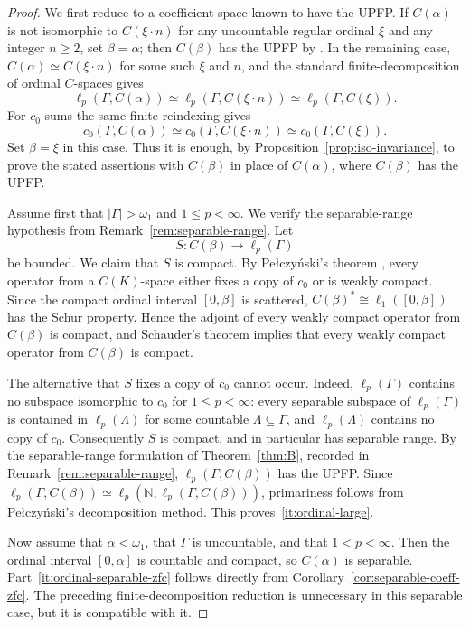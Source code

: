 \documentclass[11pt]{amsart}
\theoremstyle{plain}
\theoremstyle{definition}
\numberwithin{equation}{section}
\newcommand{\abs}[1]{\left|#1\right|}
\renewcommand{\le}{\leqslant}
\renewcommand{\ge}{\geqslant}
\begin{document}
\begin{proof}
We first reduce to a coefficient space known to have the UPFP.  If \(C(\alpha)\) is not isomorphic to \(C(\xi\cdot n)\) for any uncountable regular ordinal \(\xi\) and any integer \(n\ge 2\), set \(\beta=\alpha\); then \(C(\beta)\) has the UPFP by \cite[Proposition~1.9]{Acuaviva2025}.  In the remaining case, \(C(\alpha)\simeq C(\xi\cdot n)\) for some such \(\xi\) and \(n\), and the standard finite-decomposition of ordinal \(C\)-spaces gives
\[
    \ell_p(\Gamma,C(\alpha))\simeq \ell_p(\Gamma,C(\xi\cdot n))\simeq \ell_p(\Gamma,C(\xi)).
\]
For \(c_0\)-sums the same finite reindexing gives
\[
    c_0(\Gamma,C(\alpha))\simeq c_0(\Gamma,C(\xi\cdot n))\simeq c_0(\Gamma,C(\xi)).
\]
Set \(\beta=\xi\) in this case.  Thus it is enough, by Proposition~\ref{prop:iso-invariance}, to prove the stated assertions with \(C(\beta)\) in place of \(C(\alpha)\), where \(C(\beta)\) has the UPFP.

Assume first that \(\abs{\Gamma}>\omega_1\) and \(1\le p<\infty\).  We verify the separable-range hypothesis from Remark~\ref{rem:separable-range}.  Let
\[
    S\colon C(\beta)\to \ell_p(\Gamma)
\]
be bounded.  We claim that \(S\) is compact.  By Pe{\l}czy\'nski's theorem \cite{pelczynski1965strictly}, every operator from a \(C(K)\)-space either fixes a copy of \(c_0\) or is weakly compact.  Since the compact ordinal interval \([0,\beta]\) is scattered, \(C(\beta)^*\cong \ell_1([0,\beta])\) has the Schur property.  Hence the adjoint of every weakly compact operator from \(C(\beta)\) is compact, and Schauder's theorem implies that every weakly compact operator from \(C(\beta)\) is compact.

The alternative that \(S\) fixes a copy of \(c_0\) cannot occur.  Indeed, \(\ell_p(\Gamma)\) contains no subspace isomorphic to \(c_0\) for \(1\le p<\infty\): every separable subspace of \(\ell_p(\Gamma)\) is contained in \(\ell_p(\Lambda)\) for some countable \(\Lambda\subseteq\Gamma\), and \(\ell_p(\Lambda)\) contains no copy of \(c_0\).  Consequently \(S\) is compact, and in particular has separable range.  By the separable-range formulation of Theorem~\ref{thm:B}, recorded in Remark~\ref{rem:separable-range}, \(\ell_p(\Gamma,C(\beta))\) has the UPFP.  Since \(\ell_p(\Gamma,C(\beta))\simeq \ell_p(\mathbb N,\ell_p(\Gamma,C(\beta)))\), primariness follows from Pe{\l}czy\'nski's decomposition method.  This proves~\ref{it:ordinal-large}.

Now assume that \(\alpha<\omega_1\), that \(\Gamma\) is uncountable, and that \(1<p<\infty\).  Then the ordinal interval \([0,\alpha]\) is countable and compact, so \(C(\alpha)\) is separable.  Part~\ref{it:ordinal-separable-zfc} follows directly from Corollary~\ref{cor:separable-coeff-zfc}.  The preceding finite-decomposition reduction is unnecessary in this separable case, but it is compatible with it.
\end{proof}
\end{document}
